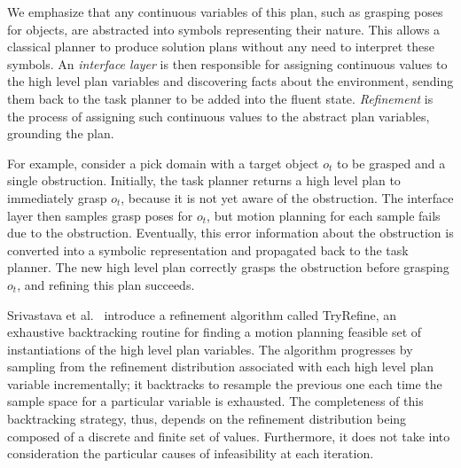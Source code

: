 
We emphasize that any continuous variables of this plan, such as grasping poses for
objects, are abstracted into symbols representing their nature. This allows a
classical planner to produce solution plans without any need to interpret these
symbols. An \emph{interface layer} is then responsible for assigning continuous values to
the high level plan variables and discovering facts about the environment, sending
them back to the task planner to be added into the fluent state. \emph{Refinement} is the
process of assigning such continuous values to the abstract plan variables, grounding the plan. 

For example, consider a pick domain with a target object $o_{t}$ to be grasped and a single obstruction.
Initially, the task planner returns a high level plan to immediately grasp $o_{t}$, because
it is not yet aware of the obstruction. The interface layer then samples grasp poses
for $o_{t}$, but motion planning for each sample fails due to the obstruction. Eventually,
this error information about the obstruction is converted into a symbolic representation
and propagated back to the task planner. The new high level plan correctly grasps the obstruction
before grasping $o_{t}$, and refining this plan succeeds.

Srivastava et al.~\cite{srivastava2014combined} introduce a refinement algorithm called TryRefine, an exhaustive backtracking routine for
finding a motion planning feasible set of instantiations of the high level plan
variables. The algorithm progresses by sampling from the refinement
distribution associated with each high level plan variable incrementally; it backtracks
to resample the previous one each time the sample space for a particular variable
is exhausted. The completeness of this backtracking strategy, thus, depends on the refinement distribution
being composed of a discrete and finite set of values. Furthermore, it does not take into consideration
the particular causes of infeasibility at each iteration.